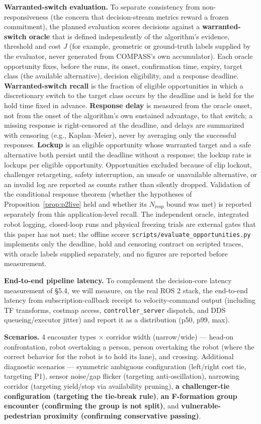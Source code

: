 \documentclass[11pt]{article}
\newcommand{\code}[1]{\texttt{#1}}
\begin{document}
\textbf{Warranted-switch evaluation.} To separate consistency from non-responsiveness (the concern that decision-stream metrics reward a frozen commitment), the planned evaluation scores decisions against a \textbf{warranted-switch oracle} that is defined independently of the algorithm's evidence, threshold and cost $J$ (for example, geometric or ground-truth labels supplied by the evaluator, never generated from COMPASS's own accumulator). Each oracle opportunity fixes, before the runs, its onset, confirmation time, expiry, target class (the available alternative), decision eligibility, and a response deadline. \textbf{Warranted-switch recall} is the fraction of eligible opportunities in which a discretionary switch to the target class occurs by the deadline and is held for the hold time fixed in advance. \textbf{Response delay} is measured from the oracle onset, not from the onset of the algorithm's own sustained advantage, to that switch; a missing response is right-censored at the deadline, and delays are summarized with censoring (e.g., Kaplan--Meier), never by averaging only the successful responses. \textbf{Lockup} is an eligible opportunity whose warranted target and a safe alternative both persist until the deadline without a response; the lockup rate is lockups per eligible opportunity. Opportunities excluded because of clip lockout, challenger retargeting, safety interruption, an unsafe or unavailable alternative, or an invalid log are reported as counts rather than silently dropped. Validation of the conditional response theorem (whether the hypotheses of Proposition~\ref{prop:p2live} held and whether its $N_{\text{resp}}$ bound was met) is reported separately from this application-level recall. The independent oracle, integrated robot logging, closed-loop runs and physical freezing trials are external gates that this paper has not met; the offline scorer \code{scripts/evaluate\_opportunities.py} implements only the deadline, hold and censoring contract on scripted traces, with oracle labels supplied separately, and no figures are reported before measurement.

\textbf{End-to-end pipeline latency.} To complement the decision-core latency measurement of \S5.4, we will measure, on the real ROS 2 stack, the end-to-end latency from subscription-callback receipt to velocity-command output (including TF transforms, costmap access, \code{controller\_server} dispatch, and DDS queueing/executor jitter) and report it as a distribution (p50, p99, max).

\textbf{Scenarios.} 4 encounter types $\times$ corridor width (narrow/wide) --- head-on confrontation, robot overtaking a person, person overtaking the robot (where the correct behavior for the robot is to hold its lane), and crossing. Additional diagnostic scenarios --- symmetric ambiguous configuration (left/right cost tie, targeting P1), sensor noise/gap flicker (targeting anti-oscillation), narrowing corridor (targeting yield/stop via availability pruning), \textbf{a challenger-tie configuration (targeting the tie-break rule)}, \textbf{an F-formation group encounter (confirming the group is not split)}, and \textbf{vulnerable-pedestrian proximity (confirming conservative passing)}.
\end{document}
